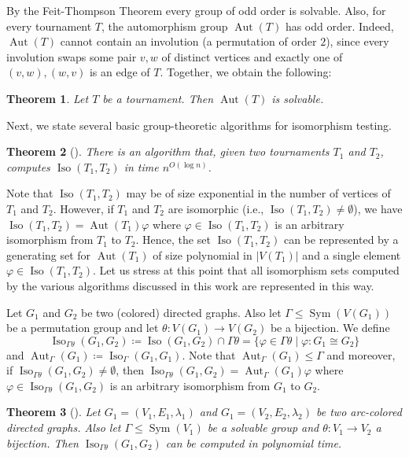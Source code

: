 \PassOptionsToPackage{dvipsnames,svgnames}{xcolor}\documentclass[10pt,a4paper]{article}
\newtheorem{theorem}{Theorem}[section]
\DeclareMathOperator{\Aut}{Aut}
\DeclareMathOperator{\Iso}{Iso}
\DeclareMathOperator{\Sym}{Sym}
\begin{document}
By the Feit-Thompson Theorem every group of odd order is solvable.
Also, for every tournament $T$, the automorphism group $\Aut(T)$ has odd order.
Indeed, $\Aut(T)$ cannot contain an involution (a permutation of order $2$), since every involution swaps some pair $v,w$ of distinct vertices and exactly one of $(v,w), (w,v)$ is an edge of $T$.
Together, we obtain the following:

\begin{theorem}
 \label{thm:aut-solvable}
 Let $T$ be a tournament.
 Then $\Aut(T)$ is solvable.
\end{theorem}

Next, we state several basic group-theoretic algorithms for isomorphism testing.

\begin{theorem}[{\cite[Theorem 4.1]{BabaiL83}}]
 \label{thm:ti}
 There is an algorithm that, given two tournaments $T_1$ and $T_2$, computes $\Iso(T_1,T_2)$ in time $n^{O(\log n)}$.
\end{theorem}

Note that $\Iso(T_1,T_2)$ may be of size exponential in the number of vertices of $T_1$ and $T_2$.
However, if $T_1$ and $T_2$ are isomorphic (i.e., $\Iso(T_1,T_2) \neq \emptyset$), we have $\Iso(T_1,T_2) = \Aut(T_1) \varphi$ where $\varphi \in \Iso(T_1,T_2)$ is an arbitrary isomorphism from $T_1$ to $T_2$.
Hence, the set $\Iso(T_1,T_2)$ can be represented by a generating set for $\Aut(T_1)$ of size polynomial in $|V(T_1)|$ and a single element $\varphi \in \Iso(T_1,T_2)$.
Let us stress at this point that all isomorphism sets computed by the various algorithms discussed in this work are represented in this way.

Let $G_1$ and $G_2$ be two (colored) directed graphs.
Also let $\Gamma \leq \Sym(V(G_1))$ be a permutation group and let $\theta\colon V(G_1) \to V(G_2)$ be a bijection.
We define
\[\Iso_{\Gamma\theta}(G_1,G_2) \coloneqq \Iso(G_1,G_2) \cap \Gamma\theta = \{\varphi \in \Gamma\theta \mid \varphi\colon G_1 \cong G_2\}\]
and $\Aut_\Gamma(G_1) \coloneqq \Iso_\Gamma(G_1,G_1)$.
Note that $\Aut_\Gamma(G_1) \leq \Gamma$ and moreover, if $\Iso_{\Gamma\theta}(G_1,G_2) \neq \emptyset$, then $\Iso_{\Gamma\theta}(G_1,G_2) = \Aut_\Gamma(G_1)\varphi$ where $\varphi \in \Iso_{\Gamma\theta}(G_1,G_2)$ is an arbitrary isomorphism from $G_1$ to $G_2$.

\begin{theorem}[{\cite[Corollary 3.6]{BabaiL83}}]
 \label{thm:gi-solvable-group}
 Let $G_1 = (V_1,E_1,\lambda_1)$ and $G_1 = (V_2,E_2,\lambda_2)$ be two arc-colored directed graphs.
 Also let $\Gamma \leq \Sym(V_1)$ be a solvable group and $\theta\colon V_1 \to V_2$ a bijection.
 Then $\Iso_{\Gamma\theta}(G_1,G_2)$ can be computed in polynomial time.
\end{theorem}
\end{document}
